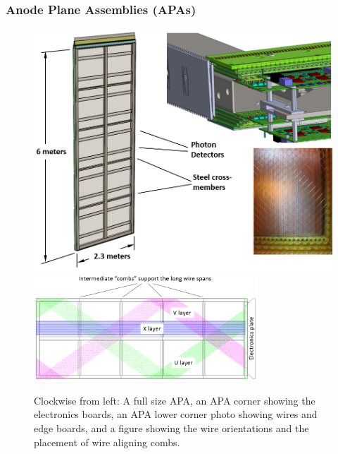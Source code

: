 
\subsubsection{Anode Plane Assemblies (APAs)}




\begin{figure}[!htb]
\centering
\begin{minipage}[b]{1.0\textwidth}
\begin{center}
\includegraphics[width=.75\textwidth]{./figures/TPC_APA_1}
\includegraphics[width=0.75\textwidth]{./figures/TPC_APA_2}
\end{center}
\end{minipage}
\caption{Clockwise from left: A full size APA, an APA corner showing the electronics boards, an APA lower corner photo showing wires and edge boards, and a figure showing the wire orientations and the placement of wire aligning combs. }
\label{fig:tpc_apa_overview} 
\end{figure}


